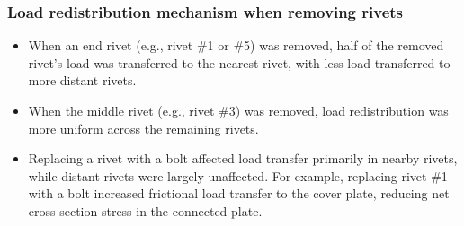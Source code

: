 \subsubsection*{Load redistribution mechanism when removing rivets}
\begin{itemize}
    \item When an end rivet (e.g., rivet \#1 or \#5) was removed, half of the removed rivet's load was transferred to the nearest rivet, with less load transferred to more distant rivets.
    \item When the middle rivet (e.g., rivet \#3) was removed, load redistribution was more uniform across the remaining rivets.
    \item Replacing a rivet with a bolt affected load transfer primarily in nearby rivets, while distant rivets were largely unaffected. For example, replacing rivet \#1 with a bolt increased frictional load transfer to the cover plate, reducing net cross-section stress in the connected plate.
\end{itemize}





